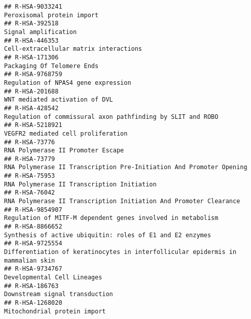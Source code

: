 \documentclass[
]{article}
\begin{document}
\begin{verbatim}
## R-HSA-9033241                                                                                                           Peroxisomal protein import
## R-HSA-392518                                                                                                                  Signal amplification
## R-HSA-446353                                                                                                Cell-extracellular matrix interactions
## R-HSA-171306                                                                                                            Packaging Of Telomere Ends
## R-HSA-9768759                                                                                                  Regulation of NPAS4 gene expression
## R-HSA-201688                                                                                                        WNT mediated activation of DVL
## R-HSA-428542                                                                           Regulation of commissural axon pathfinding by SLIT and ROBO
## R-HSA-5218921                                                                                                   VEGFR2 mediated cell proliferation
## R-HSA-73776                                                                                                      RNA Polymerase II Promoter Escape
## R-HSA-73779                                                                    RNA Polymerase II Transcription Pre-Initiation And Promoter Opening
## R-HSA-75953                                                                                             RNA Polymerase II Transcription Initiation
## R-HSA-76042                                                                      RNA Polymerase II Transcription Initiation And Promoter Clearance
## R-HSA-9854907                                                                          Regulation of MITF-M dependent genes involved in metabolism
## R-HSA-8866652                                                                            Synthesis of active ubiquitin: roles of E1 and E2 enzymes
## R-HSA-9725554                                                      Differentiation of keratinocytes in interfollicular epidermis in mammalian skin
## R-HSA-9734767                                                                                                          Developmental Cell Lineages
## R-HSA-186763                                                                                                        Downstream signal transduction
## R-HSA-1268020                                                                                                         Mitochondrial protein import

\end{verbatim}
\end{document}

